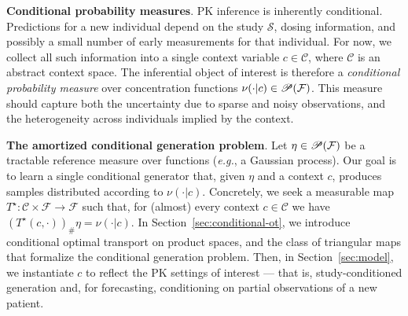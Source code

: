 \textbf{Conditional probability measures}.
%
PK inference is inherently conditional. Predictions for a new individual depend on the study $\mathcal{S}$, dosing information, and possibly a small number of early measurements for that individual. 
%
For now, we collect all such information into a single context variable $c \in \mathscr{C}$, where $\mathscr{C}$ is an abstract context space. 
%
The inferential object of interest is therefore a \textit{conditional probability measure} over concentration functions $\nu(\cdot|c) \in \mathscr{P}(\mathcal{F})$. 
%
This measure should capture both the uncertainty due to sparse and noisy observations, and the heterogeneity across individuals implied by the context.

\textbf{The amortized conditional generation problem}.
%
Let $\eta \in \mathscr{P}(\mathcal{F})$ be a tractable reference measure over functions (\textit{e.g.}, a Gaussian process).
%
Our goal is to learn a single conditional generator that, given $\eta$ and a context $c$, produces samples distributed according to $\nu(\cdot|c)$.
%
Concretely, we seek a measurable map $T^\star: \mathscr{C} \times \mathcal{F}\rightarrow \mathcal{F}$ such that, for (almost) every context $c \in \mathscr{C}$ we have
$(T^\star(c, \cdot))_{\#} \eta = \nu(\cdot | c).$ %
In Section~\ref{sec:conditional-ot}, we introduce conditional optimal transport on product spaces, and the class of triangular maps that formalize the conditional generation problem. %
%
Then, in Section~\ref{sec:model}, we instantiate $c$ to reflect the PK settings of interest --- that is, study-conditioned generation and, for forecasting, conditioning on partial observations of a new patient. 
%


